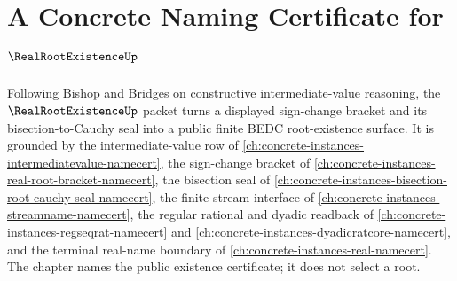 \chapter{A Concrete Naming Certificate for $\RealRootExistenceUp$}
\label{ch:concrete-instances-real-root-existence-namecert}

Following Bishop and Bridges on constructive intermediate-value reasoning, the $\RealRootExistenceUp$ packet turns a displayed sign-change bracket and its bisection-to-Cauchy seal into a public finite BEDC root-existence surface. It is grounded by the intermediate-value row of \autoref{ch:concrete-instances-intermediatevalue-namecert}, the sign-change bracket of \autoref{ch:concrete-instances-real-root-bracket-namecert}, the bisection seal of \autoref{ch:concrete-instances-bisection-root-cauchy-seal-namecert}, the finite stream interface of \autoref{ch:concrete-instances-streamname-namecert}, the regular rational and dyadic readback of \autoref{ch:concrete-instances-regseqrat-namecert} and \autoref{ch:concrete-instances-dyadicratcore-namecert}, and the terminal real-name boundary of \autoref{ch:concrete-instances-real-namecert}. The chapter names the public existence certificate; it does not select a root.

